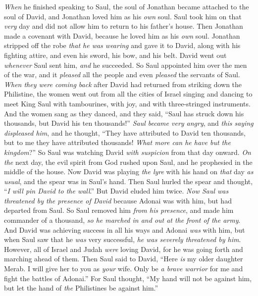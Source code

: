 \begin{biblechapter} %
 \textit{When} he finished speaking to Saul, the soul of Jonathan became attached to the soul of David, and Jonathan loved him as his \textit{own} soul.
\verse Saul took him on that \textit{very} day and did not allow him to return to his father’s house.
\verse Then Jonathan made a covenant with David, because he loved him as his \textit{own} soul.
\verse Jonathan stripped off the robe \textit{that he was wearing} and gave it to David, along with his fighting attire, and even his sword, his bow, and his belt.
 David went out \textit{whenever} Saul sent him, \textit{and} he succeeded. So Saul appointed him over the men of the war, and it \textit{pleased} all the people and even \textit{pleased} the servants of Saul.
\verse \textit{When they were coming back} after David had returned from striking down the Philistine, the women went out from all the cities of Israel singing and dancing to meet King Saul with tambourines, with joy, and with three-stringed instruments.
\verse And the women sang as they danced, and they said, “Saul has struck down his thousands, 
but David his ten thousands!”
\verse \textit{Saul became very angry}, and \textit{this saying displeased him}, and he thought, “They have attributed to David ten thousands, but to me they have attributed thousands! \textit{What more can he have but the kingdom}?”
\verse So Saul was watching David \textit{with suspicion} from that day onward.
\verse \textit{On} \textit{the} next day, the evil spirit from God rushed upon Saul, and he prophesied in the middle of the house. Now David was playing \textit{the lyre} with his hand on \textit{that} day \textit{as usual}, and the spear was in Saul’s hand.
\verse Then Saul hurled the spear and thought, “\textit{I will pin David to the wall}.” But David eluded him twice.
\verse \textit{Now Saul was threatened by the presence of David} because Adonai was with him, but had departed from Saul.
\verse So Saul removed him \textit{from his presence}, and made him commander of a thousand, \textit{so he marched in and out at the front of the army}.
\verse And David was achieving success in all his ways and Adonai \textit{was} with him,
\verse but when Saul saw that he \textit{was} very successful, \textit{he was severely threatened by him}.
\verse However, all of Israel and Judah \textit{were} loving David, for he was going forth and marching ahead of them.
 Then Saul said to David, “Here \textit{is} my older daughter Merab. I will give her to you as \textit{your} wife. Only be \textit{a brave warrior} for me and fight the battles of Adonai.” For Saul thought, “My hand will not be against him, but let the hand of \textit{the} Philistines be against him.”

\end{biblechapter}
